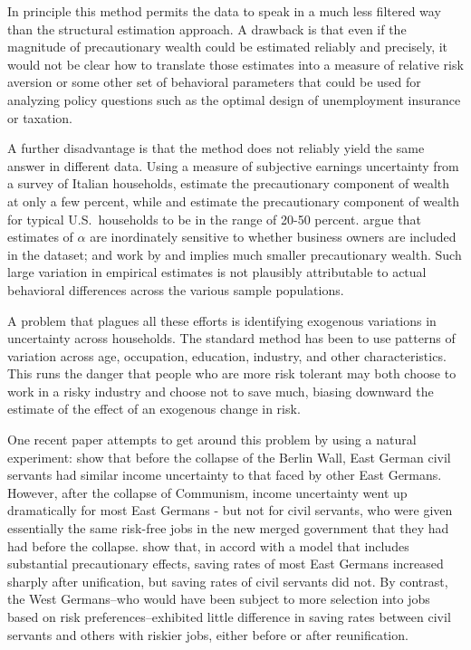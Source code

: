 In principle this method permits the data to speak in a much less
filtered way than the structural estimation approach.  A drawback is
that even if the magnitude of precautionary wealth could be estimated
reliably and precisely, it would not be clear how to translate those
estimates into a measure of relative risk aversion or some other set
of behavioral parameters that could be used for analyzing policy
questions such as the optimal design of unemployment insurance or
taxation.

A further disadvantage is that the method does not reliably yield the
same answer in different data.  Using a measure of subjective earnings uncertainty from a
survey of Italian households, \cite{gjt:smallPS} estimate the
precautionary component of wealth at only a few percent, while
\cite{kazarosian:restat} and \cite{carroll&samwick:howbig} estimate
the precautionary component of wealth for typical U.S.\ households to
be in the range of 20-50 percent.  \cite{hlkt:precautionary} argue
that estimates of $\alpha$ are inordinately sensitive to whether
business owners are included in the dataset; and work by
\cite{lusardi:importance,lusardi:subjective} and \cite{EngenGruber:UI}
implies much smaller precautionary wealth.  Such large variation in
empirical estimates is not plausibly attributable to actual behavioral
differences across the various sample populations.

A problem that plagues all these efforts is identifying exogenous
variations in uncertainty across households.  The standard method has
been to use patterns of variation across age, occupation, education,
industry, and other characteristics.  This runs the danger that people
who are more risk tolerant may both choose to work in a risky industry
and choose not to save much, biasing downward the estimate of the
effect of an exogenous change in risk.

One recent paper attempts to get around this problem by using a
natural experiment: \cite{fs:germany} show that before the collapse of
the Berlin Wall, East German civil servants had similar income
uncertainty to that faced by other East Germans.  However, after the
collapse of Communism, income uncertainty went up dramatically for
most East Germans - but not for civil servants, who were given
essentially the same risk-free jobs in the new merged government that
they had had before the collapse.  \cite{fs:germany} show that, in
accord with a model that includes substantial precautionary effects,
saving rates of most East Germans increased sharply after unification,
but saving rates of civil servants did not.  By contrast, the West
Germans--who would have been subject to more selection into jobs based
on risk preferences--exhibited little difference in saving rates
between civil servants and others with riskier jobs, either before or
after reunification.

